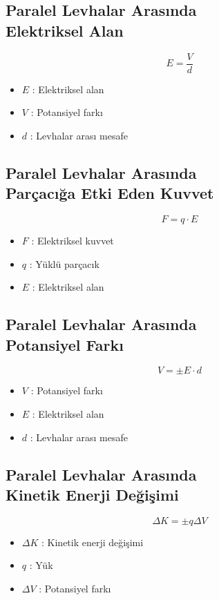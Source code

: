 \documentclass[a4paper, 11pt, titlepage]{article}
\begin{document}
\subsection[P.L.A. Elektriksel Alan]{Paralel Levhalar Arasında \\ Elektriksel Alan}
\[
E = \frac{V}{d}
\]
\begin{itemize}
  \item $E$ : Elektriksel alan
  \item $V$ : Potansiyel farkı
  \item $d$ : Levhalar arası mesafe
\end{itemize}

\subsection[P.L.A. Parçacığa Etki Eden Kuvvet]{Paralel Levhalar Arasında \\Parçacığa Etki Eden Kuvvet}
\[
F = q\cdot E
\]
\begin{itemize}
  \item $F$ : Elektriksel kuvvet
  \item $q$ : Yüklü parçacık
  \item $E$ : Elektriksel alan
\end{itemize}

\subsection[P.L.A. Potansiyel Farkı]{Paralel Levhalar Arasında \\Potansiyel Farkı}
\[
V = \pm E \cdot d
\]
\begin{itemize}
  \item $V$ : Potansiyel farkı
  \item $E$ : Elektriksel alan
  \item $d$ : Levhalar arası mesafe
\end{itemize}

\subsection[P.L.A. Kinetik Enerji Değişimi]{Paralel Levhalar Arasında \\Kinetik Enerji Değişimi}
\[
\Delta K = \pm q \Delta V
\]
\begin{itemize}
  \item $\Delta K$ : Kinetik enerji değişimi
  \item $q$ : Yük
  \item $\Delta V$ : Potansiyel farkı
\end{itemize}
\end{document}

